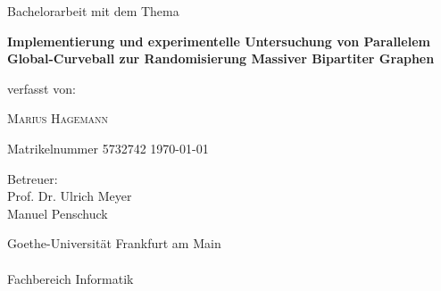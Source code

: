 \documentclass[a4paper,twoside, 11pt, openright]{scrbook}
\theoremstyle{plain} %
\theoremstyle{definition} %
\begin{document}


\begin{titlepage}
	\centering
	{\LARGE Bachelorarbeit mit dem Thema\par}
	\vfill
	{\huge\bfseries Implementierung und experimentelle Untersuchung 
					von Parallelem Global-Curveball zur Randomisierung
					Massiver Bipartiter Graphen\par}
	\vspace{2.5cm}
	{\Large verfasst von: \par}
	\vspace{1cm}
	{\LARGE \scshape Marius Hagemann\par}
	\vspace{0.5cm}
	{\large Matrikelnummer 5732742 }
	\vfill
	{\Large \today}
	\vfill
	{\LARGE Betreuer:\\ Prof. Dr. Ulrich Meyer \\ Manuel Penschuck\par}
	\vspace{1.5cm}
	{\LARGE Goethe-Universität Frankfurt am Main \\ ~\\ Fachbereich Informatik}
\end{titlepage}

\cleardoublepage 
\thispagestyle{empty}

\newpage





\newpage
\tableofcontents







\end{document}
